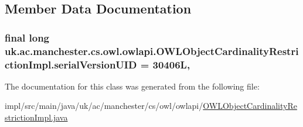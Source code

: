 \subsection{Member Data Documentation}
\hypertarget{classuk_1_1ac_1_1manchester_1_1cs_1_1owl_1_1owlapi_1_1_o_w_l_object_cardinality_restriction_impl_ab144c4d9122a49d873c6f9f9513f6186}{
\subsubsection[{serial\-Version\-U\-I\-D}]{\setlength{\rightskip}{0pt plus 5cm}final long uk.\-ac.\-manchester.\-cs.\-owl.\-owlapi.\-O\-W\-L\-Object\-Cardinality\-Restriction\-Impl.\-serial\-Version\-U\-I\-D = 30406\-L\hspace{0.3cm}{\ttfamily [static]}, {\ttfamily [private]}}}\label{classuk_1_1ac_1_1manchester_1_1cs_1_1owl_1_1owlapi_1_1_o_w_l_object_cardinality_restriction_impl_ab144c4d9122a49d873c6f9f9513f6186}


The documentation for this class was generated from the following file\-:\begin{DoxyCompactItemize}
\item 
impl/src/main/java/uk/ac/manchester/cs/owl/owlapi/\hyperlink{_o_w_l_object_cardinality_restriction_impl_8java}{O\-W\-L\-Object\-Cardinality\-Restriction\-Impl.\-java}\end{DoxyCompactItemize}
